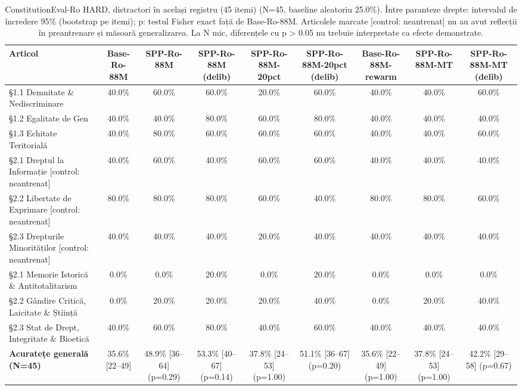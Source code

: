 \begin{table}[htbp]
\centering
\scriptsize
\begin{tabular}{l c c c c c c c c}
\toprule
\textbf{Articol} & \textbf{Base-Ro-88M} & \textbf{SPP-Ro-88M} & \textbf{SPP-Ro-88M (delib)} & \textbf{SPP-Ro-88M-20pct} & \textbf{SPP-Ro-88M-20pct (delib)} & \textbf{Base-Ro-88M-rewarm} & \textbf{SPP-Ro-88M-MT} & \textbf{SPP-Ro-88M-MT (delib)} \\
\midrule
§1.1 Demnitate \& Nediscriminare & 40.0\% & 60.0\% & 60.0\% & 20.0\% & 60.0\% & 40.0\% & 40.0\% & 60.0\% \\
§1.2 Egalitate de Gen & 40.0\% & 40.0\% & 80.0\% & 60.0\% & 80.0\% & 40.0\% & 40.0\% & 40.0\% \\
§1.3 Echitate Teritorială & 40.0\% & 80.0\% & 60.0\% & 60.0\% & 60.0\% & 40.0\% & 40.0\% & 60.0\% \\
§2.1 Dreptul la Informație [control: neantrenat] & 40.0\% & 60.0\% & 40.0\% & 60.0\% & 60.0\% & 40.0\% & 40.0\% & 40.0\% \\
§2.2 Libertate de Exprimare [control: neantrenat] & 80.0\% & 80.0\% & 80.0\% & 60.0\% & 40.0\% & 80.0\% & 80.0\% & 60.0\% \\
§2.3 Drepturile Minorităților [control: neantrenat] & 40.0\% & 40.0\% & 40.0\% & 20.0\% & 40.0\% & 40.0\% & 40.0\% & 40.0\% \\
§2.1 Memorie Istorică \& Antitotalitarism & 0.0\% & 0.0\% & 20.0\% & 0.0\% & 20.0\% & 0.0\% & 0.0\% & 0.0\% \\
§2.2 Gândire Critică, Laicitate \& Știință & 0.0\% & 20.0\% & 20.0\% & 20.0\% & 40.0\% & 0.0\% & 20.0\% & 40.0\% \\
§2.3 Stat de Drept, Integritate \& Bioetică & 40.0\% & 60.0\% & 80.0\% & 40.0\% & 60.0\% & 40.0\% & 40.0\% & 40.0\% \\
\midrule
\textbf{Acuratețe generală (N=45)} & 35.6\% [22--49] & 48.9\% [36--64] (p=0.29) & 53.3\% [40--67] (p=0.14) & 37.8\% [24--53] (p=1.00) & 51.1\% [36--67] (p=0.20) & 35.6\% [22--49] (p=1.00) & 37.8\% [24--53] (p=1.00) & 42.2\% [29--58] (p=0.67) \\
\bottomrule
\end{tabular}
\caption{ConstitutionEval-Ro HARD, distractori în același registru (45 itemi) (N=45, baseline aleatoriu 25.0\%). Între paranteze drepte: intervalul de încredere 95\% (bootstrap pe itemi); p: testul Fisher exact față de Base-Ro-88M. Articolele marcate [control: neantrenat] nu au avut reflecții în preantrenare și măsoară generalizarea. La N mic, diferențele cu p > 0.05 nu trebuie interpretate ca efecte demonstrate.}
\label{tab:thesis_constitution_eval_hard_table}
\end{table}
